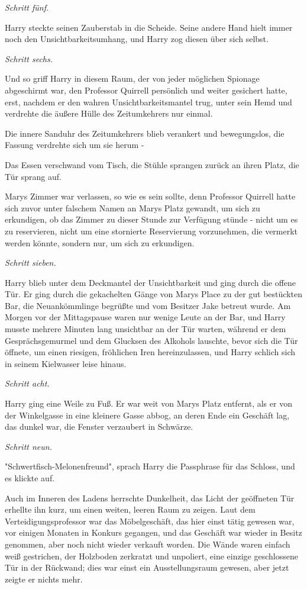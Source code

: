 {\emph{\emph{Schritt fünf.}}

Harry steckte seinen Zauberstab in die Scheide. Seine andere Hand hielt immer noch den Unsichtbarkeitsumhang, und Harry zog diesen über sich selbst.

\emph{\emph{Schritt sechs.}}

Und so griff Harry in diesem Raum, der von jeder möglichen Spionage abgeschirmt war, den Professor Quirrell persönlich und weiter gesichert hatte, erst, nachdem er den wahren Unsichtbarkeitsmantel trug, unter sein Hemd und verdrehte die äußere Hülle des Zeitumkehrers nur einmal.

Die innere Sanduhr des Zeitumkehrers blieb verankert und bewegungslos, die Fassung verdrehte sich um sie herum -

Das Essen verschwand vom Tisch, die Stühle sprangen zurück an ihren Platz, die Tür sprang auf.

Marys Zimmer war verlassen, so wie es sein sollte, denn Professor Quirrell hatte sich zuvor unter falschem Namen an Marys Platz gewandt, um sich zu erkundigen, ob das Zimmer zu dieser Stunde zur Verfügung stünde - nicht um es zu reservieren, nicht um eine stornierte Reservierung vorzunehmen, die vermerkt werden könnte, sondern nur, um sich zu erkundigen.

\emph{\emph{Schritt sieben.}}

Harry blieb unter dem Deckmantel der Unsichtbarkeit und ging durch die offene Tür. Er ging durch die gekachelten Gänge von Marys Place zu der gut bestückten Bar, die Neuankömmlinge begrüßte und vom Besitzer Jake betreut wurde. Am Morgen vor der Mittagspause waren nur wenige Leute an der Bar, und Harry musste mehrere Minuten lang unsichtbar an der Tür warten, während er dem Gesprächsgemurmel und dem Glucksen des Alkohols lauschte, bevor sich die Tür öffnete, um einen riesigen, fröhlichen Iren hereinzulassen, und Harry schlich sich in seinem Kielwasser leise hinaus.

\emph{\emph{Schritt acht.}}

Harry ging eine Weile zu Fuß. Er war weit von Marys Platz entfernt, als er von der Winkelgasse in eine kleinere Gasse abbog, an deren Ende ein Geschäft lag, das dunkel war, die Fenster verzaubert in Schwärze.

\emph{\emph{Schritt neun.}}

"Schwertfisch-Melonenfreund", sprach Harry die Passphrase für das Schloss, und es klickte auf.

Auch im Inneren des Ladens herrschte Dunkelheit, das Licht der geöffneten Tür erhellte ihn kurz, um einen weiten, leeren Raum zu zeigen. Laut dem Verteidigungsprofessor war das Möbelgeschäft, das hier einst tätig gewesen war, vor einigen Monaten in Konkurs gegangen, und das Geschäft war wieder in Besitz genommen, aber noch nicht wieder verkauft worden. Die Wände waren einfach weiß gestrichen, der Holzboden zerkratzt und unpoliert, eine einzige geschlossene Tür in der Rückwand; dies war einst ein Ausstellungsraum gewesen, aber jetzt zeigte er nichts mehr.

}
